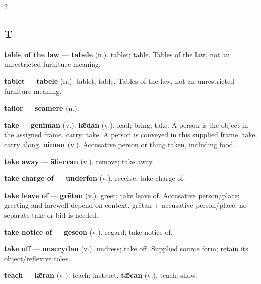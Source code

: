 \begin{multicols}{2}
\subsection*{T}
\textbf{table of the law} — \textbf{tabele} (n.). tablet; table. Tables of the law, not an unrestricted furniture meaning.\par
\textbf{tablet} — \textbf{tabele} (n.). tablet; table. Tables of the law, not an unrestricted furniture meaning.\par
\textbf{tailor} — \textbf{sēamere} (n.).\par
\textbf{take} — \textbf{geniman} (v.).  \textbf{lǣdan} (v.). lead; bring; take. A person is the object in the assigned frame. carry; take. A person is conveyed in this supplied frame. take; carry along. \textbf{niman} (v.). Accusative person or thing taken, including food.\par
\textbf{take away} — \textbf{āfierran} (v.). remove; take away.\par
\textbf{take charge of} — \textbf{underfōn} (v.). receive; take charge of.\par
\textbf{take leave of} — \textbf{grētan} (v.). greet; take leave of. Accusative person/place; greeting and farewell depend on context. grētan + accusative person/place; no separate take or bid is needed.\par
\textbf{take notice of} — \textbf{gesēon} (v.). regard; take notice of.\par
\textbf{take off} — \textbf{unscrȳdan} (v.). undress; take off. Supplied source form; retain its object/reflexive roles.\par
\textbf{teach} — \textbf{lǣran} (v.). teach; instruct. \textbf{tǣcan} (v.). teach; show.\par

\end{multicols}
